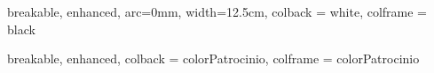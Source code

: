 
{
  breakable,
  enhanced,
  arc=0mm,
  width=12.5cm,
  colback  = white,
  colframe = black
}



{
  breakable,
  enhanced,
  colback  = colorPatrocinio,
  colframe = colorPatrocinio
}


